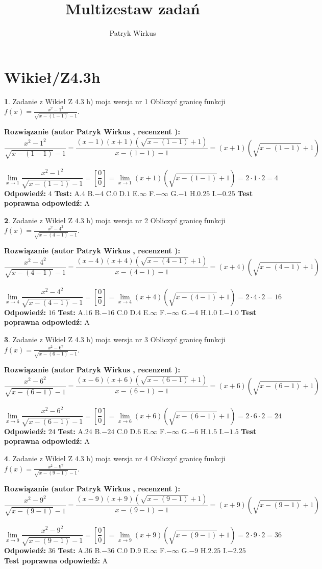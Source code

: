 \documentclass[12pt, a4paper]{article}
\title{Multizestaw zadań}
\author{Patryk Wirkus}
\date{}
\theoremstyle{definition} %
\newtheorem{zad}{}
\newcommand{\kategoria}[1]{\section{#1}}
\newcommand{\zadStart}[1]{\begin{zad}#1\newline}
\newcommand{\zadStop}{\end{zad}}
\newcommand{\rozwStart}[2]{\noindent \textbf{Rozwiązanie (autor #1 , recenzent #2): }\newline}
\newcommand{\rozwStop}{\newline}
\newcommand{\odpStart}{\noindent \textbf{Odpowiedź:}\newline}
\newcommand{\odpStop}{\newline}
\newcommand{\testStart}{\noindent \textbf{Test:}\newline}
\newcommand{\testStop}{\newline}
\newcommand{\kluczStart}{\noindent \textbf{Test poprawna odpowiedź:}\newline}
\newcommand{\kluczStop}{\newline}
\begin{document}
\maketitle

\kategoria{Wikieł/Z4.3h}


\zadStart{Zadanie z Wikieł Z 4.3 h) moja wersja nr 1}
Obliczyć granicę funkcji $f(x)=\frac{x^{2} - 1^{2}}{\sqrt{x-(1-1)}-1}$.
\zadStop
\rozwStart{Patryk Wirkus}{}
$$\frac{x^{2} - 1^{2}}{\sqrt{x-(1-1)}-1}=\frac{(x-1)(x+1)(\sqrt{x-(1-1)}+1)}{x-(1-1)-1}=(x+1)(\sqrt{x-(1-1)}+1)$$
\\
$$\lim\limits_{x\to 1}\frac{x^{2} - 1^{2}}{\sqrt{x-(1-1)}-1}=[\frac{0}{0}]=
\lim\limits_{x\to 1}(x+1)(\sqrt{x-(1-1)}+1) = 2\cdot1 \cdot 2 = 4$$
\rozwStop
\odpStart
$4$
\odpStop
\testStart
A.$4$
B.$-4$
C.$0$
D.$1$
E.$\infty$
F.$-\infty$
G.$-1$
H.$0.25$
I.$-0.25$
\testStop
\kluczStart
A
\kluczStop



\zadStart{Zadanie z Wikieł Z 4.3 h) moja wersja nr 2}
Obliczyć granicę funkcji $f(x)=\frac{x^{2} - 4^{2}}{\sqrt{x-(4-1)}-1}$.
\zadStop
\rozwStart{Patryk Wirkus}{}
$$\frac{x^{2} - 4^{2}}{\sqrt{x-(4-1)}-1}=\frac{(x-4)(x+4)(\sqrt{x-(4-1)}+1)}{x-(4-1)-1}=(x+4)(\sqrt{x-(4-1)}+1)$$
\\
$$\lim\limits_{x\to 4}\frac{x^{2} - 4^{2}}{\sqrt{x-(4-1)}-1}=[\frac{0}{0}]=
\lim\limits_{x\to 4}(x+4)(\sqrt{x-(4-1)}+1) = 2\cdot4 \cdot 2 = 16$$
\rozwStop
\odpStart
$16$
\odpStop
\testStart
A.$16$
B.$-16$
C.$0$
D.$4$
E.$\infty$
F.$-\infty$
G.$-4$
H.$1.0$
I.$-1.0$
\testStop
\kluczStart
A
\kluczStop



\zadStart{Zadanie z Wikieł Z 4.3 h) moja wersja nr 3}
Obliczyć granicę funkcji $f(x)=\frac{x^{2} - 6^{2}}{\sqrt{x-(6-1)}-1}$.
\zadStop
\rozwStart{Patryk Wirkus}{}
$$\frac{x^{2} - 6^{2}}{\sqrt{x-(6-1)}-1}=\frac{(x-6)(x+6)(\sqrt{x-(6-1)}+1)}{x-(6-1)-1}=(x+6)(\sqrt{x-(6-1)}+1)$$
\\
$$\lim\limits_{x\to 6}\frac{x^{2} - 6^{2}}{\sqrt{x-(6-1)}-1}=[\frac{0}{0}]=
\lim\limits_{x\to 6}(x+6)(\sqrt{x-(6-1)}+1) = 2\cdot6 \cdot 2 = 24$$
\rozwStop
\odpStart
$24$
\odpStop
\testStart
A.$24$
B.$-24$
C.$0$
D.$6$
E.$\infty$
F.$-\infty$
G.$-6$
H.$1.5$
I.$-1.5$
\testStop
\kluczStart
A
\kluczStop



\zadStart{Zadanie z Wikieł Z 4.3 h) moja wersja nr 4}
Obliczyć granicę funkcji $f(x)=\frac{x^{2} - 9^{2}}{\sqrt{x-(9-1)}-1}$.
\zadStop
\rozwStart{Patryk Wirkus}{}
$$\frac{x^{2} - 9^{2}}{\sqrt{x-(9-1)}-1}=\frac{(x-9)(x+9)(\sqrt{x-(9-1)}+1)}{x-(9-1)-1}=(x+9)(\sqrt{x-(9-1)}+1)$$
\\
$$\lim\limits_{x\to 9}\frac{x^{2} - 9^{2}}{\sqrt{x-(9-1)}-1}=[\frac{0}{0}]=
\lim\limits_{x\to 9}(x+9)(\sqrt{x-(9-1)}+1) = 2\cdot9 \cdot 2 = 36$$
\rozwStop
\odpStart
$36$
\odpStop
\testStart
A.$36$
B.$-36$
C.$0$
D.$9$
E.$\infty$
F.$-\infty$
G.$-9$
H.$2.25$
I.$-2.25$
\testStop
\kluczStart
A
\kluczStop
\end{document}
